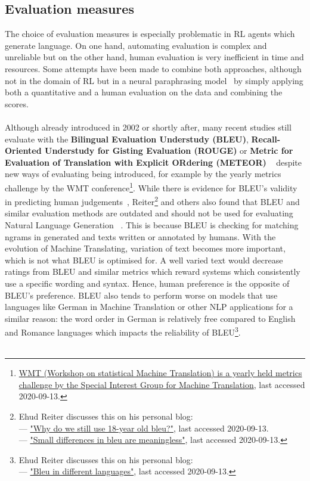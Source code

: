 \documentclass[11pt]{article}
\begin{document}
\subsection{Evaluation measures}\label{evaluation}
The choice of evaluation measures is especially problematic in RL agents which generate language. On one hand, automating evaluation is complex and unreliable but on the other hand, human evaluation is very inefficient in time and resources. Some attempts have been made to combine both approaches, although not in the domain of RL but in a neural paraphrasing model~\cite{goyal-durrett-2020-neural} by simply applying both a quantitative and a human evaluation on the data and combining the scores. \\\\
Although already introduced in 2002 or shortly after, many recent studies still evaluate with the \textbf{Bilingual Evaluation Understudy (BLEU)}, \textbf{Recall-Oriented Understudy for Gisting Evaluation (ROUGE)} or \textbf{Metric for Evaluation of Translation with Explicit ORdering (METEOR)} ~\cite{lin-2004-rouge,banerjee-lavie-2005-meteor} despite new ways of evaluating being introduced, for example by the yearly metrics challenge by the WMT conference\footnote{\hyperlink{http://www.sigmt.org/}{WMT (Workshop on statistical Machine Translation) is a yearly held metrics challenge by the Special Interest Group for Machine Translation}, last accessed 2020-09-13.}. While there is evidence for BLEU's validity in predicting human judgements~\cite{reiter-2018-astructured}, Reiter\footnote{Ehud Reiter discusses this on his personal blog:\\ --- \hyperlink{https://ehudreiter.com/2020/03/02/why-use-18-year-old-bleu/}{"Why do we still use 18-year old bleu?"}, last accessed 2020-09-13. \\ --- \hyperlink{https://ehudreiter.com/2020/07/28/small-differences-in-bleu-are-meaningless/}{"Small differences in bleu are meaningless"}, last accessed 2020-09-13.} and others also found that BLEU and similar evaluation methods are outdated and should not be used for evaluating Natural Language Generation ~\cite{reiter-2018-astructured,mathur-etal-2020-tangled}. This is because BLEU is checking for matching ngrams in generated and texts written or annotated by humans. With the evolution of Machine Translating, variation of text becomes more important, which is not what BLEU is optimised for. A well varied text would decrease ratings from BLEU and similar metrics which reward systems which consistently use a specific wording and syntax. Hence, human preference is the opposite of BLEU's preference. BLEU also tends to perform worse on models that use languages like German in Machine Translation or other NLP applications for a similar reason: the word order in German is relatively free compared to English and Romance languages which impacts the reliability of BLEU\footnote{Ehud Reiter discusses this on his personal blog: \\ --- \hyperlink{https://ehudreiter.com/2018/06/20/bleu-in-different-languages/}{"Bleu   in   different   languages"}, last accessed 2020-09-13.}.\\\\
\end{document}
